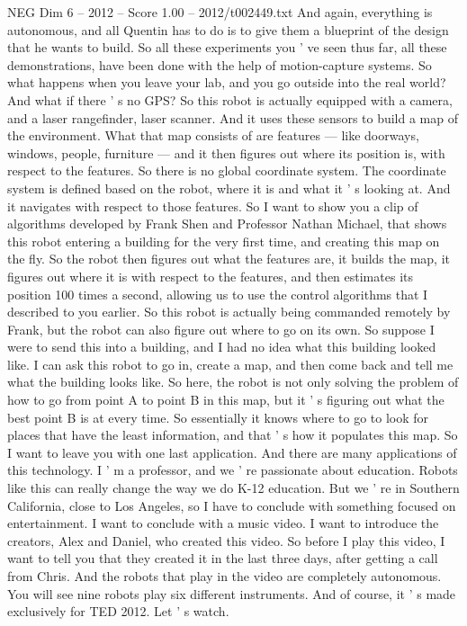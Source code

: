 \begin{textsample}{NEG Dim 6 – 2012 – Score 1.00 – 2012/t002449.txt}
And again, everything is autonomous, and all Quentin has to do is to give them a blueprint of the design that he wants to build.
So all these experiments you ' ve seen thus far, all these demonstrations, have been done with the help of motion-capture systems.
So what happens when you leave your lab, and you go outside into the real world?
And what if there ' s no GPS?
So this robot is actually equipped with a camera, and a laser rangefinder, laser scanner.
And it uses these sensors to build a map of the environment.
What that map consists of are features — like doorways, windows, people, furniture — and it then figures out where its position is, with respect to the features.
So there is no global coordinate system.
The coordinate system is defined based on the robot, where it is and what it ' s looking at.
And it navigates with respect to those features.
So I want to show you a clip of algorithms developed by Frank Shen and Professor Nathan Michael, that shows this robot entering a building for the very first time, and creating this map on the fly.
So the robot then figures out what the features are, it builds the map, it figures out where it is with respect to the features, and then estimates its position 100 times a second, allowing us to use the control algorithms that I described to you earlier.
So this robot is actually being commanded remotely by Frank, but the robot can also figure out where to go on its own.
So suppose I were to send this into a building, and I had no idea what this building looked like.
I can ask this robot to go in, create a map, and then come back and tell me what the building looks like.
So here, the robot is not only solving the problem of how to go from point A to point B in this map, but it ' s figuring out what the best point B is at every time.
So essentially it knows where to go to look for places that have the least information, and that ' s how it populates this map.
So I want to leave you with one last application.
And there are many applications of this technology.
I ' m a professor, and we ' re passionate about education.
Robots like this can really change the way we do K-12 education.
But we ' re in Southern California, close to Los Angeles, so I have to conclude with something focused on entertainment.
I want to conclude with a music video.
I want to introduce the creators, Alex and Daniel, who created this video.
So before I play this video, I want to tell you that they created it in the last three days, after getting a call from Chris.
And the robots that play in the video are completely autonomous.
You will see nine robots play six different instruments.
And of course, it ' s made exclusively for TED 2012.
Let ' s watch.

\end{textsample}

